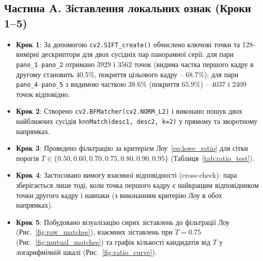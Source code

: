 \documentclass[14pt, a4paper]{extarticle}
\begin{document}
\subsection{Частина A. Зіставлення локальних ознак (Кроки 1--5)}
\begin{itemize}
    \item \textbf{Крок 1}: За допомогою \texttt{cv2.SIFT\_create()} обчислено ключові точки та 128-вимірні дескриптори для двох сусідніх пар панорамної серії: для пари \texttt{pano\_1}--\texttt{pano\_2} отримано $3929$ і $3562$ точок (видима частка першого кадру в другому становить $40.5\%$, покриття цільового кадру -- $68.7\%$); для пари \texttt{pano\_4}--\texttt{pano\_5} з видимою часткою $38.6\%$ (покриття $65.9\%$) -- $4037$ і $2409$ точок відповідно.
    \item \textbf{Крок 2}: Створено \texttt{cv2.BFMatcher(cv2.NORM\_L2)} і виконано пошук двох найближчих сусідів \texttt{knnMatch(desc1, desc2, k=2)} у прямому та зворотному напрямках.
    \item \textbf{Крок 3}: Проведено фільтрацію за критерієм Лоу~\eqref{eq:lowe_ratio} для сітки порогів $T \in \{0.50, 0.60, 0.70, 0.75, 0.80, 0.90, 0.95\}$ (Таблиця~\ref{tab:ratio_test}).
    \item \textbf{Крок 4}: Застосовано вимогу взаємної відповідності (cross-check): пара зберігається лише тоді, коли точка першого кадру є найкращим відповідником точки другого кадру і навпаки (з виконанням критерію Лоу в обох напрямках).
    \item \textbf{Крок 5}: Побудовано візуалізацію сирих зіставлень до фільтрації Лоу (Рис.~\ref{fig:raw_matches}), взаємних зіставлень при $T=0.75$ (Рис.~\ref{fig:mutual_matches}) та графік кількості кандидатів від $T$ у логарифмічній шкалі (Рис.~\ref{fig:ratio_curve}).
\end{itemize}
\end{document}
